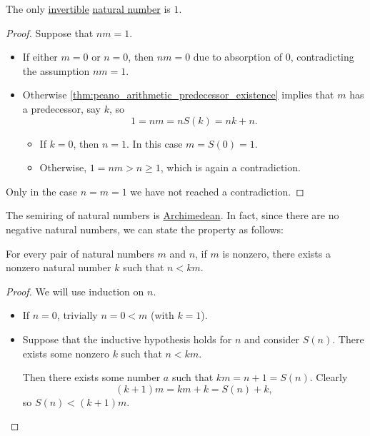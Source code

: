 \begin{proposition}\label{thm:natural_number_multiplicative_invertibility}
  The only \hyperref[def:semiring_divisibility/invertible]{invertible} \hyperref[def:natural_numbers]{natural number} is \( 1 \).
\end{proposition}
\begin{proof}
  Suppose that \( nm = 1 \).
  \begin{itemize}
    \item If either \( m = 0 \) or \( n = 0 \), then \( nm = 0 \) due to absorption of \( 0 \), contradicting the assumption \( nm = 1 \).
    \item Otherwise \cref{thm:peano_arithmetic_predecessor_existence} implies that \( m \) has a predecessor, say \( k \), so
    \begin{equation*}
      1 = nm = n S(k) = nk + n.
    \end{equation*}

    \begin{itemize}
      \item If \( k = 0 \), then \( n = 1 \). In this case \( m = S(0) = 1 \).
      \item Otherwise, \( 1 = nm > n \geq 1 \), which is again a contradiction.
    \end{itemize}
  \end{itemize}

  Only in the case \( n = m = 1 \) we have not reached a contradiction.
\end{proof}

\begin{proposition}\label{thm:natural_numbers_archimedean}
  The semiring of natural numbers is \hyperref[def:archimedean_semiring]{Archimedean}. In fact, since there are no negative natural numbers, we can state the property as follows:
  \begin{displayquote}
    For every pair of natural numbers \( m \) and \( n \), if \( m \) is nonzero, there exists a nonzero natural number \( k \) such that \( n < km \).
  \end{displayquote}
\end{proposition}
\begin{proof}
  We will use induction on \( n \).

  \begin{itemize}
    \item If \( n = 0 \), trivially \( n = 0 < m \) (with \( k = 1 \)).

    \item Suppose that the inductive hypothesis holds for \( n \) and consider \( S(n) \). There exists some nonzero \( k \) such that \( n < km \).

    Then there exists some number \( a \) such that \( km = n + 1 = S(n) \). Clearly
    \begin{equation*}
      (k + 1)m = km + k = S(n) + k,
    \end{equation*}
    so \( S(n) < (k + 1) m \).
  \end{itemize}
\end{proof}

